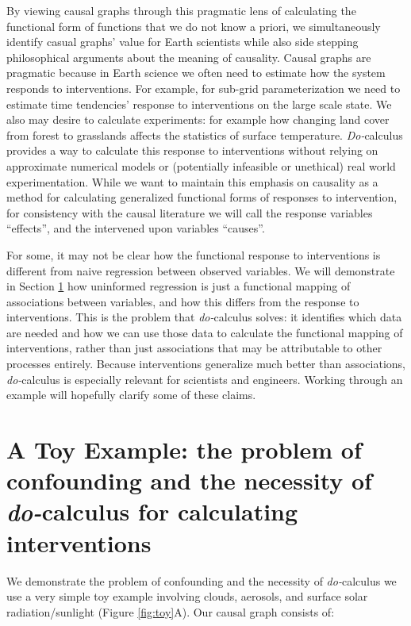 \documentclass[12pt]{article}
\begin{document}
By viewing causal graphs through this pragmatic lens of calculating
the functional form of functions that we do not know a priori, we
simultaneously identify casual graphs' value for Earth scientists
while also side stepping philosophical arguments about the meaning of
causality. Causal graphs are pragmatic because in Earth science we
often need to estimate how the system responds to interventions. For
example, for sub-grid parameterization we need to estimate time
tendencies' response to interventions on the large scale state. We
also may desire to calculate experiments: for example how changing
land cover from forest to grasslands affects the statistics of surface
temperature. \textit{Do-}calculus provides a way to calculate this
response to interventions without relying on approximate numerical
models or (potentially infeasible or unethical) real world
experimentation. While we want to maintain this emphasis on causality
as a method for calculating generalized functional forms of responses
to intervention, for consistency with the causal literature we will
call the response variables ``effects'', and the intervened upon
variables ``causes''.

For some, it may not be clear how the functional response to
interventions is different from naive regression between observed
variables. We will demonstrate in Section
\ref{sec:causal-graphs-pearls} how uninformed regression is just a
functional mapping of associations between variables, and how this
differs from the response to interventions. This is the problem that
\textit{do-}calculus solves: it identifies which data are needed and
how we can use those data to calculate the functional mapping of
interventions, rather than just associations that may be attributable
to other processes entirely. Because interventions generalize much
better than associations, \textit{do-}calculus is especially relevant
for scientists and engineers. Working through an example will
hopefully clarify some of these claims.

\section{A Toy Example: the problem of confounding and the necessity
  of \textit{do-}calculus for calculating interventions}
\label{sec:causal-graphs-pearls}

We demonstrate the problem of confounding and the necessity of
\textit{do-}calculus we use a very simple toy example involving
clouds, aerosols, and surface solar radiation/sunlight (Figure
\ref{fig:toy}A). Our causal graph consists of:
\end{document}
